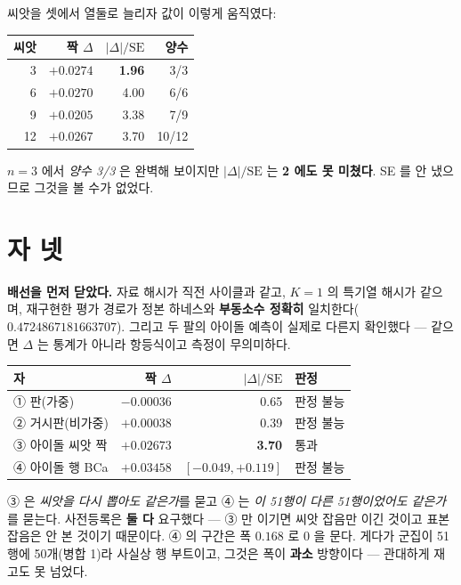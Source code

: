 \documentclass[10pt]{article}
\begin{document}
씨앗을 셋에서 열둘로 늘리자 값이 이렇게 움직였다:

\begin{center}\small
\begin{tabular}{rrrr}
\toprule
씨앗 & 짝 $\Delta$ & $|\Delta|/\mathrm{SE}$ & 양수 \\
\midrule
3 & $+0.0274$ & \textbf{1.96} & 3/3 \\
6 & $+0.0270$ & 4.00 & 6/6 \\
9 & $+0.0205$ & 3.38 & 7/9 \\
12 & $+0.0267$ & 3.70 & 10/12 \\
\bottomrule
\end{tabular}
\end{center}

$n{=}3$ 에서 \emph{양수 3/3} 은 완벽해 보이지만
$|\Delta|/\mathrm{SE}$ 는 \textbf{2 에도 못 미쳤다}. SE 를 안 냈으므로 그것을
볼 수가 없었다.

\section{자 넷}

\textbf{배선을 먼저 닫았다.} 자료 해시가 직전 사이클과 같고, $K{=}1$ 의 특기열
해시가 같으며, 재구현한 평가 경로가 정본 하네스와 \textbf{부동소수 정확히}
일치한다($0.4724867181663707$). 그리고 두 팔의 아이돌 예측이 실제로 다른지
확인했다 --- 같으면 $\Delta$ 는 통계가 아니라 항등식이고 측정이 무의미하다.

\begin{center}\small
\begin{tabular}{lrrl}
\toprule
자 & 짝 $\Delta$ & $|\Delta|/\mathrm{SE}$ & 판정 \\
\midrule
① 판(가중) & $-0.00036$ & 0.65 & 판정 불능 \\
② 거시판(비가중) & $+0.00038$ & 0.39 & 판정 불능 \\
③ 아이돌 씨앗 짝 & $+0.02673$ & \textbf{3.70} & 통과 \\
④ 아이돌 행 BCa & $+0.03458$ & $[-0.049,+0.119]$ & 판정 불능 \\
\bottomrule
\end{tabular}
\end{center}

③ 은 \emph{씨앗을 다시 뽑아도 같은가}를 묻고 ④ 는 \emph{이 51행이 다른
51행이었어도 같은가}를 묻는다. 사전등록은 \textbf{둘 다} 요구했다 --- ③ 만
이기면 씨앗 잡음만 이긴 것이고 표본 잡음은 안 본 것이기 때문이다. ④ 의 구간은
폭 $0.168$ 로 0 을 문다. 게다가 군집이 51행에 50개(병합 1)라 사실상 행
부트이고, 그것은 폭이 \textbf{과소} 방향이다 --- 관대하게 재고도 못 넘었다.
\end{document}
